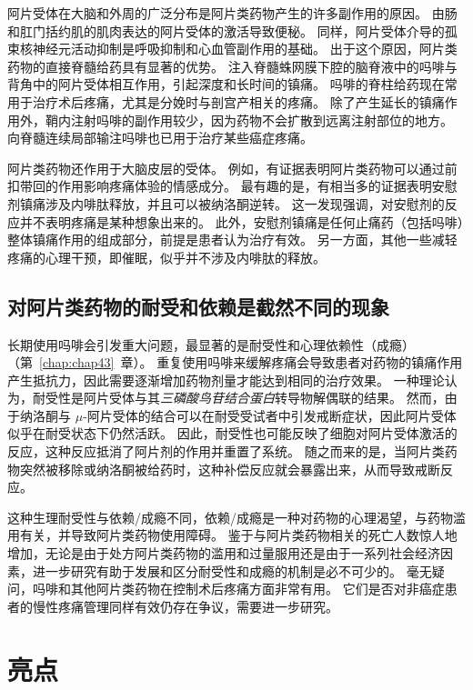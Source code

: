 阿片受体在大脑和外周的广泛分布是阿片类药物产生的许多副作用的原因。
由肠和肛门括约肌的肌肉表达的阿片受体的激活导致便秘。
同样，阿片受体介导的孤束核神经元活动抑制是呼吸抑制和心血管副作用的基础。
出于这个原因，阿片类药物的直接脊髓给药具有显著的优势。
注入脊髓蛛网膜下腔的脑脊液中的吗啡与背角中的阿片受体相互作用，引起深度和长时间的镇痛。
吗啡的脊柱给药现在常用于治疗术后疼痛，尤其是分娩时与剖宫产相关的疼痛。
除了产生延长的镇痛作用外，鞘内注射吗啡的副作用较少，因为药物不会扩散到远离注射部位的地方。
向脊髓连续局部输注吗啡也已用于治疗某些癌症疼痛。


阿片类药物还作用于大脑皮层的受体。
例如，有证据表明阿片类药物可以通过前扣带回的作用影响疼痛体验的情感成分。
最有趣的是，有相当多的证据表明安慰剂镇痛涉及内啡肽释放，并且可以被纳洛酮逆转。
这一发现强调，对安慰剂的反应并不表明疼痛是某种想象出来的。
此外，安慰剂镇痛是任何止痛药（包括吗啡）整体镇痛作用的组成部分，前提是患者认为治疗有效。
另一方面，其他一些减轻疼痛的心理干预，即催眠，似乎并不涉及内啡肽的释放。



\subsection{对阿片类药物的耐受和依赖是截然不同的现象}

长期使用吗啡会引发重大问题，最显著的是耐受性和心理依赖性（成瘾）（第~\ref{chap:chap43}~章）。
重复使用吗啡来缓解疼痛会导致患者对药物的镇痛作用产生抵抗力，因此需要逐渐增加药物剂量才能达到相同的治疗效果。
一种理论认为，耐受性是阿片受体与其\textit{三磷酸鸟苷结合蛋白}转导物解偶联的结果。
然而，由于纳洛酮与 $\mu$-阿片受体的结合可以在耐受受试者中引发戒断症状，因此阿片受体似乎在耐受状态下仍然活跃。
因此，耐受性也可能反映了细胞对阿片受体激活的反应，这种反应抵消了阿片剂的作用并重置了系统。
随之而来的是，当阿片类药物突然被移除或纳洛酮被给药时，这种补偿反应就会暴露出来，从而导致戒断反应。


这种生理耐受性与依赖/成瘾不同，依赖/成瘾是一种对药物的心理渴望，与药物滥用有关，并导致阿片类药物使用障碍。
鉴于与阿片类药物相关的死亡人数惊人地增加，无论是由于处方阿片类药物的滥用和过量服用还是由于一系列社会经济因素，进一步研究有助于发展和区分耐受性和成瘾的机制是必不可少的。
毫无疑问，吗啡和其他阿片类药物在控制术后疼痛方面非常有用。
它们是否对非癌症患者的慢性疼痛管理同样有效仍存在争议，需要进一步研究。



\section{亮点}

